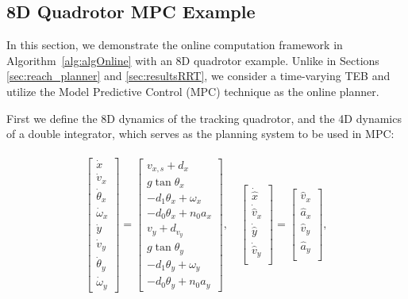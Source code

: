 \subsection{8D Quadrotor MPC Example \label{sec:resultsMPC}}

In this section, we demonstrate the online computation framework in Algorithm~\ref{alg:algOnline} with an 8D quadrotor example. Unlike in Sections \ref{sec:reach_planner} and \ref{sec:resultsRRT}, we consider a time-varying TEB and utilize the Model Predictive Control (MPC) technique as the online planner. 

First we define the 8D dynamics of the tracking quadrotor, and the 4D dynamics of a double integrator, which serves as the planning system to be used in MPC:

\begin{equation}
\label{eq:Quad8D_dyn}
\begin{aligned}
\begin{array}{c}
\left[
\begin{array}{c}
\dot x\\
\dot v_x\\
\dot \theta_x\\
\dot \omega_x\\
\dot y\\
\dot v_y\\
\dot \theta_y\\
\dot \omega_y
\end{array}
\right]
=
\left[
\begin{array}{c}
v_{x,s} + d_x\\
g \tan \theta_x\\
-d_1 \theta_x + \omega_x\\
-d_0 \theta_x + n_0 a_x\\
v_y + d_{v_y}\\
g \tan \theta_y\\
-d_1 \theta_y + \omega_y\\
-d_0 \theta_y + n_0 a_y
\end{array}
\right], \quad
\left[
\begin{array}{c}
\dot {\hat x}\\
\dot {\hat v}_x\\
\dot {\hat y}\\
\dot {\hat v}_y\\
\end{array}
\right] 
=
\left[
\begin{array}{c}
\hat v_x\\
\hat a_x\\
\hat v_y\\
\hat a_y\\
\end{array}
\right],
\end{array}\\
\end{aligned}
\end{equation}
